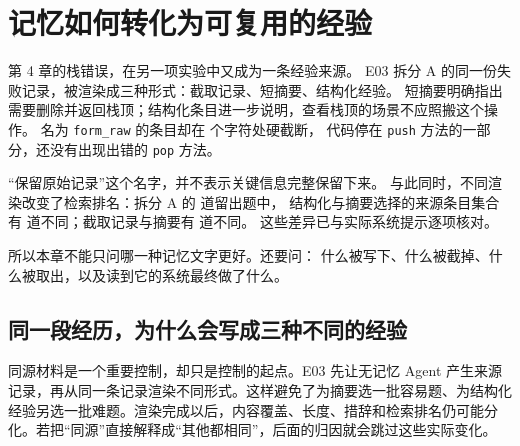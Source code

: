 \chapter{记忆如何转化为可复用的经验}
\label{ch05}


\begin{failurebox}
第 4 章的栈错误，在另一项实验中又成为一条经验来源。
E03 拆分 A 的同一份失败记录，被渲染成三种形式：截取记录、短摘要、结构化经验。
短摘要明确指出需要删除并返回栈顶；结构化条目进一步说明，查看栈顶的场景不应照搬这个操作。
名为 \texttt{form\_raw} 的条目却在  个字符处硬截断，
代码停在 \texttt{push} 方法的一部分，还没有出现出错的 \texttt{pop} 方法。

“保留原始记录”这个名字，并不表示关键信息完整保留下来。
与此同时，不同渲染改变了检索排名：拆分 A 的  道留出题中，
结构化与摘要选择的来源条目集合有  道不同；截取记录与摘要有  道不同。
这些差异已与实际系统提示逐项核对。

所以本章不能只问哪一种记忆文字更好。还要问：
什么被写下、什么被截掉、什么被取出，以及读到它的系统最终做了什么。
\end{failurebox}


\section{同一段经历，为什么会写成三种不同的经验}
\label{sec:ch05-same-source}

同源材料是一个重要控制，却只是控制的起点。E03 先让无记忆 Agent 产生来源记录，再从同一条记录渲染不同形式。这样避免了为摘要选一批容易题、为结构化经验另选一批难题。渲染完成以后，内容覆盖、长度、措辞和检索排名仍可能分化。若把“同源”直接解释成“其他都相同”，后面的归因就会跳过这些实际变化。

